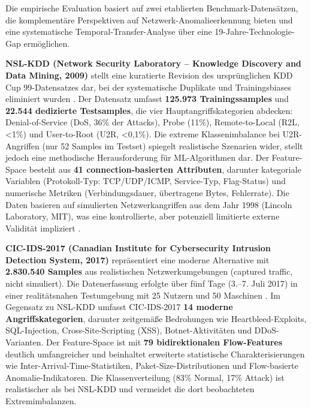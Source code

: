 \documentclass[11pt,a4paper]{article}
\begin{document}
    Die empirische Evaluation basiert auf zwei etablierten Benchmark-Datensätzen, die komplementäre Perspektiven auf Netzwerk-Anomalieerkennung bieten und eine systematische Temporal-Transfer-Analyse über eine 19-Jahre-Technologie-Gap ermöglichen.

    \textbf{NSL-KDD (Network Security Laboratory – Knowledge Discovery and Data Mining, 2009)} stellt eine kuratierte Revision des ursprünglichen KDD Cup 99-Datensatzes dar, bei der systematische Duplikate und Trainingsbiases eliminiert wurden \parencite{Tavallaee2009}. Der Datensatz umfasst \textbf{125.973 Trainingssamples} und \textbf{22.544 dedizierte Testsamples}, die vier Hauptangriffskategorien abdecken: Denial-of-Service (DoS, 36\% der Attacks), Probe (11\%), Remote-to-Local (R2L, <1\%) und User-to-Root (U2R, <0,1\%). Die extreme Klassenimbalance bei U2R-Angriffen (nur 52 Samples im Testset) spiegelt realistische Szenarien wider, stellt jedoch eine methodische Herausforderung für ML-Algorithmen dar. Der Feature-Space besteht aus \textbf{41 connection-basierten Attributen}, darunter kategoriale Variablen (Protokoll-Typ: TCP/UDP/ICMP, Service-Typ, Flag-Status) und numerische Metriken (Verbindungsdauer, übertragene Bytes, Fehlerrate). Die Daten basieren auf simulierten Netzwerkangriffen aus dem Jahr 1998 (Lincoln Laboratory, MIT), was eine kontrollierte, aber potenziell limitierte externe Validität impliziert \parencite{McHugh2000}.

    \textbf{CIC-IDS-2017 (Canadian Institute for Cybersecurity Intrusion Detection System, 2017)} repräsentiert eine moderne Alternative mit \textbf{2.830.540 Samples} aus realistischen Netzwerkumgebungen (captured traffic, nicht simuliert). Die Datenerfassung erfolgte über fünf Tage (3.–7. Juli 2017) in einer realitätsnahen Testumgebung mit 25 Nutzern und 50 Maschinen \parencite{Sharafaldin2018}. Im Gegensatz zu NSL-KDD umfasst CIC-IDS-2017 \textbf{14 moderne Angriffskategorien}, darunter zeitgemäße Bedrohungen wie Heartbleed-Exploits, SQL-Injection, Cross-Site-Scripting (XSS), Botnet-Aktivitäten und DDoS-Varianten. Der Feature-Space ist mit \textbf{79 bidirektionalen Flow-Features} deutlich umfangreicher und beinhaltet erweiterte statistische Charakterisierungen wie Inter-Arrival-Time-Statistiken, Paket-Size-Distributionen und Flow-basierte Anomalie-Indikatoren. Die Klassenverteilung (83\% Normal, 17\% Attack) ist realistischer als bei NSL-KDD und vermeidet die dort beobachteten Extremimbalanzen.
\end{document}

